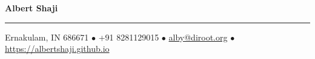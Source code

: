 {\LARGE\bfseries Albert Shaji}

\rule{\textwidth}{0.5pt}

Ernakulam, IN 686671 {\scriptsize $\bullet$}
+91 8281129015 {\scriptsize $\bullet$}
\href{mailto:alby@disroot.org}{alby@diroot.org} {\scriptsize $\bullet$}
\href{https://albertshaji.github.io/}{https://albertshaji.github.io}
